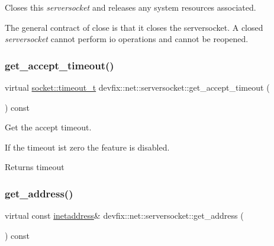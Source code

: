 Closes this {\itshape serversocket} and releases any system resources associated. 

The general contract of close is that it closes the serversocket. A closed {\itshape serversocket} cannot perform io operations and cannot be reopened. \mbox{\label{structdevfix_1_1net_1_1serversocket_a9c27c5bcd0adb034fe069ae67e0114c5}} 
\subsubsection{\texorpdfstring{get\+\_\+accept\+\_\+timeout()}{get\_accept\_timeout()}}
{\footnotesize\ttfamily virtual \hyperlink{structdevfix_1_1net_1_1socket_a80a3bf4cb7292bae31ea9c6575539c68}{socket\+::timeout\+\_\+t} devfix\+::net\+::serversocket\+::get\+\_\+accept\+\_\+timeout (\begin{DoxyParamCaption}{ }\end{DoxyParamCaption}) const\hspace{0.3cm}{\ttfamily [pure virtual]}}



Get the accept timeout. 

If the timeout ist zero the feature is disabled. \begin{DoxyReturn}{Returns}
timeout 
\end{DoxyReturn}
\mbox{\label{structdevfix_1_1net_1_1serversocket_a28fc78cccaa3a40441399ac3b32abec8}} 
\subsubsection{\texorpdfstring{get\+\_\+address()}{get\_address()}}
{\footnotesize\ttfamily virtual const \hyperlink{structdevfix_1_1net_1_1inetaddress}{inetaddress}\& devfix\+::net\+::serversocket\+::get\+\_\+address (\begin{DoxyParamCaption}{ }\end{DoxyParamCaption}) const\hspace{0.3cm}{\ttfamily [pure virtual]}}



